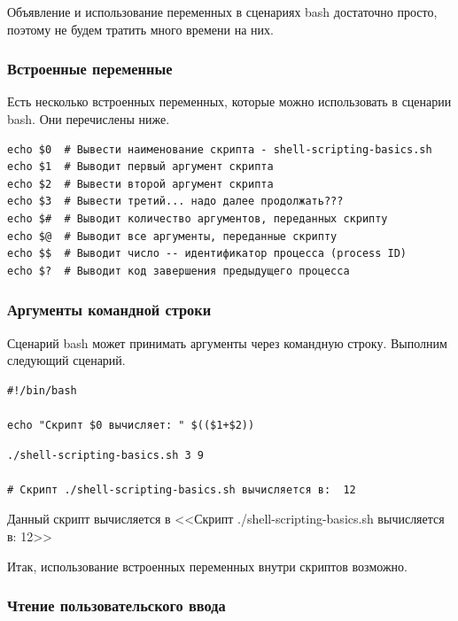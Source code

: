 \documentclass[12pt]{article}
\begin{document}
Объявление и использование переменных в сценариях bash достаточно
просто, поэтому не будем тратить много времени на них.

\hypertarget{Built-In-Variables}{%
\subsubsection{\texorpdfstring{\protect\hyperlink{Built-In-Variables}{}Встроенные
переменные}{Встроенные переменные}}\label{Built-In-Variables}}

Есть несколько встроенных переменных, которые можно использовать в
сценарии bash. Они перечислены ниже.

\begin{verbatim}
echo $0  # Вывести наименование скрипта - shell-scripting-basics.sh
echo $1  # Выводит первый аргумент скрипта
echo $2  # Вывести второй аргумент скрипта
echo $3  # Вывести третий... надо далее продолжать???
echo $#  # Выводит количество аргументов, переданных скрипту
echo $@  # Выводит все аргументы, переданные скрипту
echo $$  # Выводит число -- идентификатор процесса (process ID)
echo $?  # Выводит код завершения предыдущего процесса
\end{verbatim}

\hypertarget{Command-Line-Arguments}{%
\subsubsection{\texorpdfstring{\protect\hyperlink{Command-Line-Arguments}{}Аргументы
командной
строки}{Аргументы командной строки}}\label{Command-Line-Arguments}}

Сценарий bash может принимать аргументы через командную строку. Выполним
следующий сценарий.

\begin{verbatim}
#!/bin/bash

echo "Скрипт $0 вычисляет: " $(($1+$2))
\end{verbatim}

\begin{verbatim}
./shell-scripting-basics.sh 3 9

# Скрипт ./shell-scripting-basics.sh вычисляется в:  12
\end{verbatim}

Данный скрипт вычисляется в <<Скрипт ./shell-scripting-basics.sh
вычисляется в: 12>>

Итак, использование встроенных переменных внутри скриптов возможно.

\hypertarget{Reading-user-input}{%
\subsubsection{\texorpdfstring{\protect\hyperlink{Reading-user-input}{}Чтение
пользовательского
ввода}{Чтение пользовательского ввода}}\label{Reading-user-input}}
\end{document}
